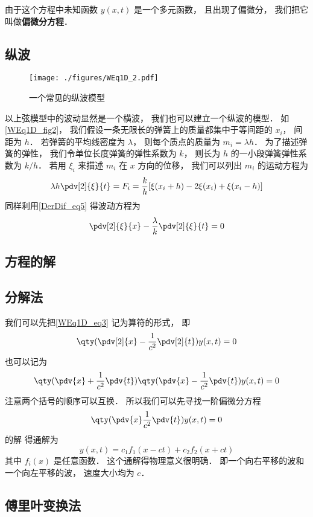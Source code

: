 由于这个方程中未知函数 $y(x,t)$ 是一个多元函数， 且出现了偏微分， 我们把它叫做\textbf{偏微分方程}．

\subsection{纵波}

\begin{figure}[ht]
\centering
\texttt{[image: ./figures/WEq1D\_2.pdf]}
\caption{一个常见的纵波模型} \label{WEq1D_fig2}
\end{figure}

以上弦模型中的波动显然是一个横波， 我们也可以建立一个纵波的模型． 如\autoref{WEq1D_fig2}， 我们假设一条无限长的弹簧上的质量都集中于等间距的 $x_i$， 间距为 $h$． 若弹簧的平均线密度为 $\lambda$， 则每个质点的质量为 $m_i = \lambda h$． 为了描述弹簧的弹性， 我们令单位长度弹簧的弹性系数为 $k$， 则长为 $h$ 的一小段弹簧弹性系数为 $k/h$． 若用 $\xi_i$ 来描述 $m_i$ 在 $x$ 方向的位移， 我们可以列出 $m_i$ 的运动方程为
\begin{equation}
\lambda h \pdv[2]{\xi}{t} = F_i = \frac kh [\xi(x_i + h) - 2\xi(x_i) + \xi(x_i - h)]
\end{equation}
同样利用\autoref{DerDif_eq5} 得波动方程为
\begin{equation}
\pdv[2]{\xi}{x} - \frac{\lambda}{k}\pdv[2]{\xi}{t} = 0
\end{equation}

\subsection{方程的解}

\subsection{分解法}
我们可以先把\autoref{WEq1D_eq3} 记为算符的形式， 即
\begin{equation}
\qty(\pdv[2]{x} - \frac{1}{c^2}\pdv[2]{t}) y(x, t) = 0
\end{equation}
也可以记为
\begin{equation}
\qty(\pdv{x} + \frac{1}{c^2}\pdv{t})\qty(\pdv{x} - \frac{1}{c^2}\pdv{t}) y(x, t) = 0
\end{equation}
注意两个括号的顺序可以互换． 所以我们可以先寻找一阶偏微分方程
\begin{equation}
\qty(\pdv{x}  \frac{1}{c^2}\pdv{t})y(x, t)  = 0
\end{equation}
的解%
得通解为
\begin{equation}
y(x, t) = c_1 f_1(x - ct) + c_2 f_2(x + ct)
\end{equation}
其中 $f_i(x)$ 是任意函数． 这个通解得物理意义很明确． 即一个向右平移的波和一个向左平移的波， 速度大小均为 $c$．

\subsection{傅里叶变换法}
